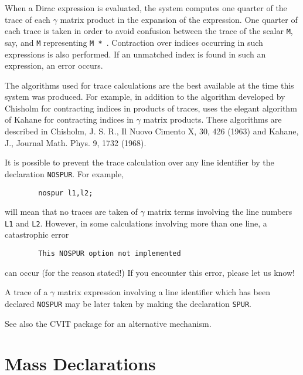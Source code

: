 When a Dirac expression is evaluated, the system computes one quarter of
the trace of each $\gamma$ matrix product in the expansion of the expression.
One quarter of each trace is taken in order to avoid confusion between the
trace of the scalar \texttt{M}, say, and \texttt{M} representing
\texttt{M * }.  
Contraction over indices occurring in such expressions is
also performed.  If an unmatched index is found in such an expression, an
error occurs.

The algorithms used for trace calculations are the best available at the
time this system was produced. For example, in addition to the algorithm
developed by Chisholm for contracting indices in products of traces,
{\REDUCE} uses the elegant algorithm of Kahane for contracting indices in
$\gamma$ matrix products.  These algorithms are described in Chisholm, J. S.
R., Il Nuovo Cimento X, 30, 426 (1963) and Kahane, J., Journal Math.
Phys. 9, 1732 (1968).

It is possible to prevent the trace calculation over any line identifier
by the declaration \texttt{NOSPUR}.  For example,
\begin{verbatim}
        nospur l1,l2;
\end{verbatim}
will mean that no traces are taken of $\gamma$ matrix terms involving the line
numbers \texttt{L1} and \texttt{L2}.  However, in some calculations involving
more than one line, a catastrophic error
\begin{verbatim}
        This NOSPUR option not implemented
\end{verbatim}
can occur (for the reason stated!) If you encounter this error, please let
us know!

A trace of a $\gamma$ matrix expression involving a line identifier which has
been declared \texttt{NOSPUR} may be later taken by making the declaration
\texttt{SPUR}.

See also the CVIT package for an alternative
mechanism.

\section{Mass Declarations}
\hypertarget{command:MASS}{}
\hypertarget{command:MSHELL}{}

